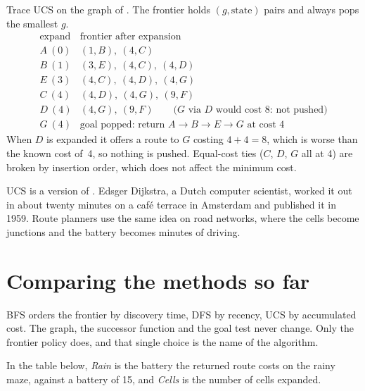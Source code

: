 \begin{workedexample}
Trace UCS on the graph of . The frontier holds $(g,\text{state})$ pairs and always pops the smallest $g$.
\[
\begin{array}{c|l}
\text{expand} & \text{frontier after expansion} \\
\hline
A\ (0) & (1,B),\ (4,C) \\
B\ (1) & (3,E),\ (4,C),\ (4,D) \\
E\ (3) & (4,C),\ (4,D),\ (4,G) \\
C\ (4) & (4,D),\ (4,G),\ (9,F) \\
D\ (4) & (4,G),\ (9,F) \qquad\text{($G$ via $D$ would cost 8: not pushed)} \\
G\ (4) & \text{goal popped: return } A\to B\to E\to G \text{ at cost } 4
\end{array}
\]
When $D$ is expanded it offers a route to $G$ costing $4+4=8$, which is worse than the known cost of~4, so nothing is pushed. Equal-cost ties ($C$, $D$, $G$ all at 4) are broken by insertion order, which does not affect the minimum cost.
\end{workedexample}

\begin{libnote}
UCS is a version of . Edsger Dijkstra, a Dutch computer scientist, worked it out in about twenty minutes on a caf\'e terrace in Amsterdam and published it in 1959. Route planners use the same idea on road networks, where the cells become junctions and the battery becomes minutes of driving.
\end{libnote}

\section{Comparing the methods so far}

\begin{keyidea}
BFS orders the frontier by discovery time, DFS by recency, UCS by accumulated cost. The graph, the successor function and the goal test never change. Only the frontier policy does, and that single choice is the name of the algorithm.
\end{keyidea}

In the table below, \emph{Rain} is the battery the returned route costs on the rainy maze, against a battery of 15, and \emph{Cells} is the number of cells expanded.

